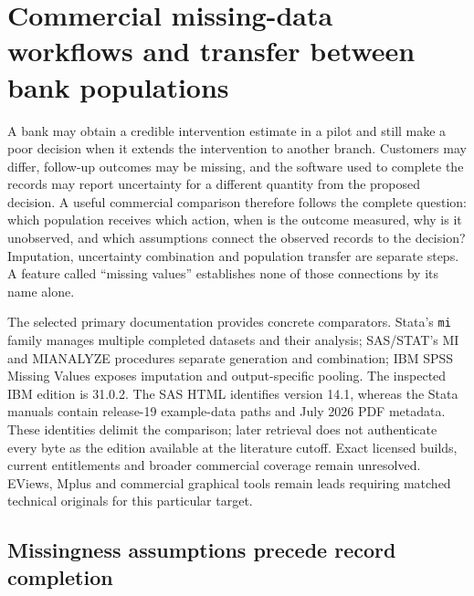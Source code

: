 \section{Commercial missing-data workflows and transfer between bank populations}
\label{exec21:transport-scope}

A bank may obtain a credible intervention estimate in a pilot and still make a
poor decision when it extends the intervention to another branch. Customers may
differ, follow-up outcomes may be missing, and the software used to complete
the records may report uncertainty for a different quantity from the proposed
decision. A useful commercial comparison therefore follows the complete
question: which population receives which action, when is the outcome measured,
why is it unobserved, and which assumptions connect the observed records to the
decision? Imputation, uncertainty combination and population transfer are
separate steps. A feature called ``missing values'' establishes none of those
connections by its name alone.

The selected primary documentation provides concrete comparators. Stata's
\texttt{mi} family manages multiple completed datasets and their analysis;
SAS/STAT's MI and MIANALYZE procedures separate generation and combination;
IBM SPSS Missing Values exposes imputation and output-specific pooling.
The inspected IBM edition is 31.0.2. The SAS HTML identifies version 14.1,
whereas the Stata manuals contain release-19 example-data paths and July 2026
PDF metadata. These identities delimit the comparison; later retrieval does
not authenticate every byte as the edition available at the literature cutoff.
Exact licensed builds, current entitlements and broader commercial coverage
remain unresolved. EViews, Mplus and commercial graphical tools remain leads
requiring matched technical originals for this particular target.
\cite{exec21_transport_stata_mi,exec21_transport_sas_mi_intro,exec21_transport_spss_missing}

\subsection{Missingness assumptions precede record completion}
\label{exec21:transport-missingness}


